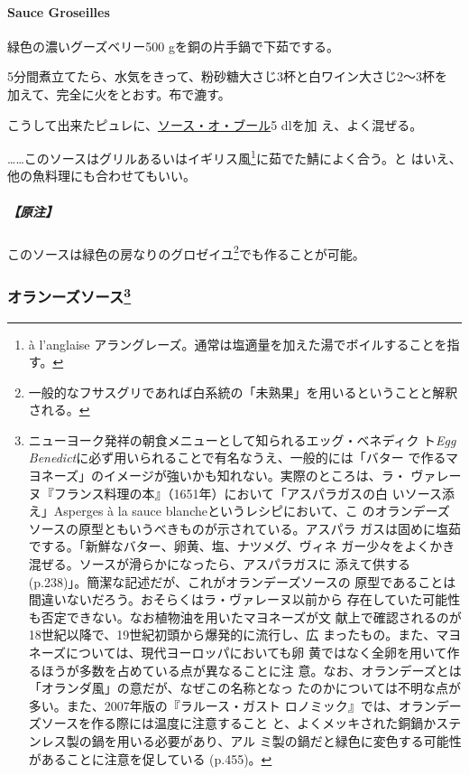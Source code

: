 \begin{recette}
\hypertarget{sauce-groseilles}{%
\paragraph{Sauce Groseilles}\label{sauce-groseilles}}


緑色の濃いグーズベリー500 gを銅の片手鍋で下茹でする。

5分間煮立てたら、水気をきって、粉砂糖大さじ3杯と白ワイン大さじ2〜3杯を
加えて、完全に火をとおす。布で漉す。

こうして出来たピュレに、\protect\hyperlink{sauce-au-beurre}{ソース・オ・ブール}5
dlを加 え、よく混ぜる。

\ldots{}\ldots{}このソースはグリルあるいはイギリス風\footnote{à
  l'anglaise
  アラングレーズ。通常は塩適量を加えた湯でボイルすることを指す。}に茹でた鯖によく合う。と
はいえ、他の魚料理にも合わせてもいい。

\hypertarget{ux539fux6ce8-8}{%
\subparagraph{【原注】}\label{ux539fux6ce8-8}}

このソースは緑色の房なりのグロゼイユ\footnote{一般的なフサスグリであれば白系統の「未熟果」を用いるということと解釈される。}でも作ることが可能。

\maeaki

\hypertarget{ux30aaux30e9ux30f3ux30fcux30baux30bdux30fcux30b954}{%
\subsubsection[オランーズソース]{\texorpdfstring{オランーズソース\footnote{ニューヨーク発祥の朝食メニューとして知られるエッグ・ベネディク
  ト\emph{Egg
  Benedict}に必ず用いられることで有名なうえ、一般的には「バター
  で作るマヨネーズ」のイメージが強いかも知れない。実際のところは、ラ・
  ヴァレーヌ『フランス料理の本』（1651年）において「アスパラガスの白
  いソース添え」Asperges à la sauce blancheというレシピにおいて、こ
  のオランデーズソースの原型ともいうべきものが示されている。アスパラ
  ガスは固めに塩茹でする。「新鮮なバター、卵黄、塩、ナツメグ、ヴィネ
  ガー少々をよくかき混ぜる。ソースが滑らかになったら、アスパラガスに
  添えて供する(p.238)」。簡潔な記述だが、これがオランデーズソースの
  原型であることは間違いないだろう。おそらくはラ・ヴァレーヌ以前から
  存在していた可能性も否定できない。なお植物油を用いたマヨネーズが文
  献上で確認されるのが18世紀以降で、19世紀初頭から爆発的に流行し、広
  まったもの。また、マヨネーズについては、現代ヨーロッパにおいても卵
  黄ではなく全卵を用いて作るほうが多数を占めている点が異なることに注
  意。なお、オランデーズとは「オランダ風」の意だが、なぜこの名称となっ
  たのかについては不明な点が多い。また、2007年版の『ラルース・ガスト
  ロノミック』では、オランデーズソースを作る際には温度に注意すること
  と、よくメッキされた銅鍋かステンレス製の鍋を用いる必要があり、アル
  ミ製の鍋だと緑色に変色する可能性があることに注意を促している (p.455)。}}{オランーズソース}}\label{ux30aaux30e9ux30f3ux30fcux30baux30bdux30fcux30b954}}


\end{recette}
